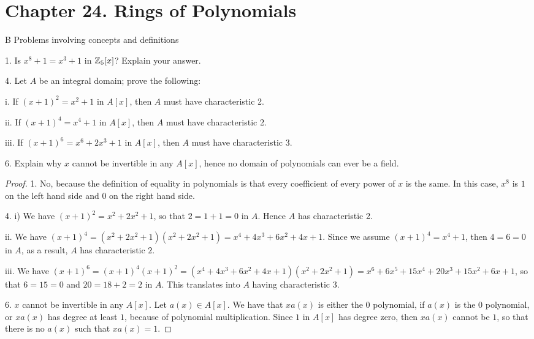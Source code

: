 \section*{Chapter 24. Rings of Polynomials}


\begin{exercise}{B Problems involving concepts and definitions}

1. Is $x^8 + 1 = x^3 + 1$ in $\mathbb{Z}_{5}[x]$? Explain your answer.

4. Let $A$ be an integral domain; prove the following:
 
i. If $(x+1)^2 = x^2 +1$ in $A[x]$, then $A$ must have characteristic 2.

ii. If $(x+1)^4 = x^4 +1$ in $A[x]$, then $A$ must have characteristic 2.

iii. If $(x+1)^6 = x^6 + 2x^3 +1$ in $A[x]$, then $A$ must have characteristic 3.

6. Explain why $x$ cannot be invertible in any $A[x]$, hence no domain of polynomials can ever be a field.
\end{exercise}
\begin{proof}
 1. No, because the definition of equality in polynomials is that every coefficient of every power of $x$ is the same. In this case, $x^8$ is $1$ on the left hand side and $0$ on the right hand side.
 
 4. i) We have $(x+1)^2 = x^2 + 2x^2 + 1$, so that $2=1+1=0$ in $A$. Hence $A$ has characteristic 2.
 
 ii. We have $(x+1)^4 = (x^2 + 2x^2 + 1)(x^2 + 2x^2 + 1)= x^4 + 4x^3 + 6x^2 + 4x + 1$. Since we assume $(x+1)^4 = x^4 +1$, then $4=6=0$ in $A$, as a result, $A$ has characteristic $2$.
 
 iii. We have $(x+1)^6 =(x+1)^4 (x+1)^2 = (x^4 + 4x^3 + 6x^2 + 4x + 1)(x^2 + 2x^2 + 1) = x^6 + 6x^5 + 15x^4 + 20x^3 + 15x^2 + 6x + 1$, so that $6=15=0$ and $20=18+2=2$ in $A$. This translates into $A$ having characteristic $3$.
 
 6. $x$ cannot be invertible in any $A[x]$. Let $a(x)\in A[x]$. We have that $xa(x)$ is either the $0$ polynomial, if $a(x)$ is the $0$ polynomial, or $xa(x)$ has degree at least $1$, because of polynomial multiplication. Since $1$ in $A[x]$ has degree zero, then $xa(x)$ cannot be $1$, so that there is no $a(x)$ such that $xa(x)=1$.
\end{proof}

